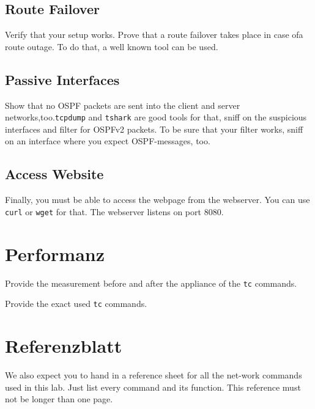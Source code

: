 \documentclass[11pt,titlepage]{article}
\newenvironment{shadedquotation}
 {\begin{shaded*}
  \quoting[leftmargin=0pt, vskip=0pt]
 }
 {\endquoting
 \end{shaded*}
}
\begin{document}
\subsection{Route Failover}
\label{subsec:RouteFailover}
\begin{shadedquotation}
  Verify that your setup works. Prove that a route failover takes place in case ofa route outage. To do that, a well known tool can be used.
\end{shadedquotation}

\subsection{Passive Interfaces}
\label{subsec:PassiveInterfaces}
\begin{shadedquotation}
  Show that no OSPF packets are sent into the client and server networks,too.\lstinline!tcpdump! and \lstinline!tshark! are good tools for that, sniff on the suspicious interfaces and filter for OSPFv2 packets. To be sure that your filter works, sniff on an interface where you expect OSPF-messages, too.
\end{shadedquotation}

\subsection{Access Website}
\label{subsec:AccessWebsite}
\begin{shadedquotation}
  Finally, you must be able to access the webpage from the webserver. You can use \lstinline!curl! or \lstinline!wget! for that. The webserver listens on port 8080.
\end{shadedquotation}

\section{Performanz}
\label{sec:Performanz}
\begin{shadedquotation}
  Provide the measurement before and after the appliance of the \lstinline!tc! commands.
  
  Provide the exact used \lstinline!tc! commands.
\end{shadedquotation}

\section{Referenzblatt}
\label{sec:Referenzblatt}
\begin{shadedquotation}
  We also expect you to hand in a reference sheet for all the net-work commands used in this lab. Just list every command and its function. This reference must not be longer than one page.
\end{shadedquotation}
\end{document}

